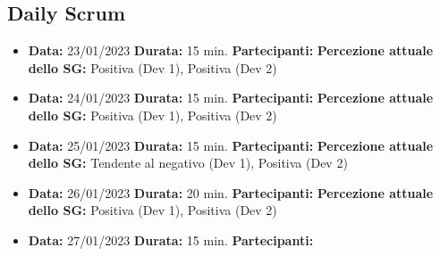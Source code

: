 \begin{landscape}
        \subsection{Daily Scrum}

        \begin{itemize}
            \item \textbf{Data:} 23/01/2023
            \newline \textbf{Durata:} 15 min.
            \newline \textbf{Partecipanti:} \tre
            \newline \textbf{Percezione attuale dello SG:} Positiva (Dev 1), Positiva (Dev 2)
        \end{itemize}
        \begin{itemize}
            \item \textbf{Data:} 24/01/2023
            \newline \textbf{Durata:} 15 min.
            \newline \textbf{Partecipanti:} \tre
            \newline \textbf{Percezione attuale dello SG:} Positiva (Dev 1), Positiva (Dev 2)
        \end{itemize}
        \begin{itemize}
            \item \textbf{Data:} 25/01/2023
            \newline \textbf{Durata:} 15 min.
            \newline \textbf{Partecipanti:} \tre
            \newline \textbf{Percezione attuale dello SG:} Tendente al negativo (Dev 1), Positiva (Dev 2)
        \end{itemize}
        \begin{itemize}
            \item \textbf{Data:} 26/01/2023
            \newline \textbf{Durata:} 20 min.
            \newline \textbf{Partecipanti:} \tre
            \newline \textbf{Percezione attuale dello SG:} Positiva (Dev 1), Positiva (Dev 2)
        \end{itemize}
        \begin{itemize}
            \item \textbf{Data:} 27/01/2023
            \newline \textbf{Durata:} 15 min.
            \newline \textbf{Partecipanti:} \tre

\end{itemize}
\end{landscape}
